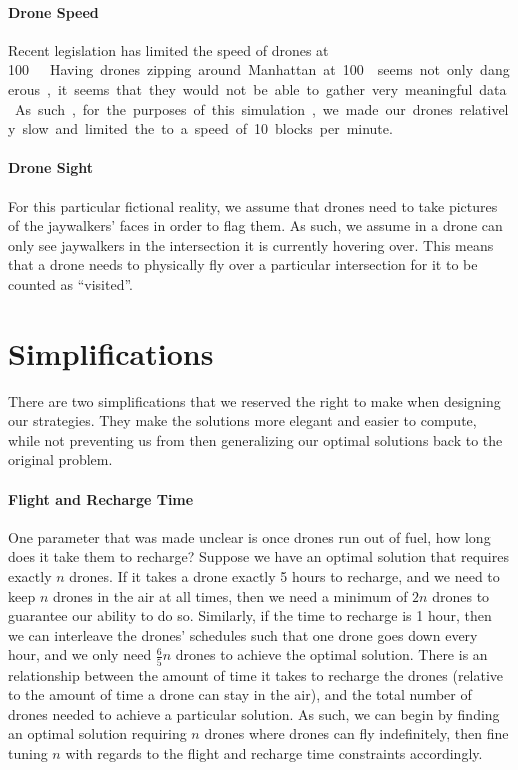 \documentclass{article}
\begin{document}
\paragraph{Drone Speed}
\label{par:drone_speed}
Recent legislation has limited the speed of drones at \SI{100}\mph \cite{dronespeed}. Having drones zipping around Manhattan at \SI{100}\mph seems not only dangerous, it seems that they would not be able to gather very meaningful data. As such, for the purposes of this simulation, we made our drones relatively slow and limited the to a speed of 10 blocks per minute.

\paragraph{Drone Sight}
\label{par:drone_sight}
For this particular fictional reality, we assume that drones need to take pictures of the jaywalkers' faces in order to flag them. As such, we assume in a drone can only see jaywalkers in the intersection it is currently hovering over. This means that a drone needs to physically fly over a particular intersection for it to be counted as ``visited''.

\section{Simplifications}
There are two simplifications that we reserved the right to make when designing our strategies. They make the solutions more elegant and easier to compute, while not preventing us from then generalizing our optimal solutions back to the original problem.
\paragraph{Flight and Recharge Time}
\label{par:flight_and_recharge_time}
One parameter that was made unclear is once drones run out of fuel, how long does it take them to recharge? Suppose we have an optimal solution that requires exactly $n$ drones. If it takes a drone exactly 5 hours to recharge, and we need to keep $n$ drones in the air at all times, then we need a minimum of $2n$ drones to guarantee our ability to do so. Similarly, if the time to recharge is 1 hour, then we can interleave the drones' schedules such that one drone goes down every hour, and we only need $\frac{6}{5}n$ drones to achieve the optimal solution. There is an relationship between the amount of time it takes to recharge the drones (relative to the amount of time a drone can stay in the air), and the total number of drones needed to achieve a particular solution. As such, we can begin by finding an optimal solution requiring $n$ drones where drones can fly indefinitely, then fine tuning $n$ with regards to the flight and recharge time constraints accordingly.
\end{document}
